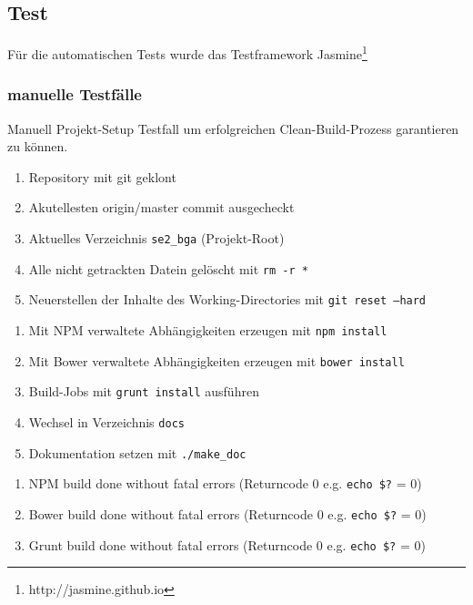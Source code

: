 \subsection{Test}
Für die automatischen Tests wurde das Testframework Jasmine\footnote{http://jasmine.github.io}
\subsubsection{manuelle Testfälle}
\begin{testcase}[tc:build]{Manuell}
\tcSubject Projekt-Setup
\tcRemark Testfall um erfolgreichen Clean-Build-Prozess garantieren zu können.
\tcConditions
	\begin{enumerate}
	\item Repository mit git geklont
	\item Akutellesten origin/master commit ausgecheckt
	\item Aktuelles Verzeichnis \texttt{se2\_bga} (Projekt-Root)
	\item Alle nicht getrackten Datein gelöscht mit \texttt{rm -r *}
	\item Neuerstellen der Inhalte des Working-Directories mit \texttt{git reset --hard}
	\end{enumerate}
\tcProceeding
	\begin{enumerate}
	\item Mit NPM verwaltete Abhängigkeiten erzeugen mit \texttt{npm install}
	\item Mit Bower verwaltete Abhängigkeiten erzeugen mit \texttt{bower install}
	\item Build-Jobs mit \texttt{grunt install} ausführen
	\item Wechsel in Verzeichnis \texttt{docs}
	\item Dokumentation setzen mit \texttt{./make\_doc}
	\end{enumerate}
\tcGoal
	\begin{enumerate}
	\item NPM build done without fatal errors (Returncode 0 e.g. \texttt{echo \$?} = 0)
	\item Bower build done without fatal errors (Returncode 0 e.g. \texttt{echo \$?} = 0)
	\item Grunt build done without fatal errors (Returncode 0 e.g. \texttt{echo \$?} = 0)
	\end{enumerate}
\end{testcase}


